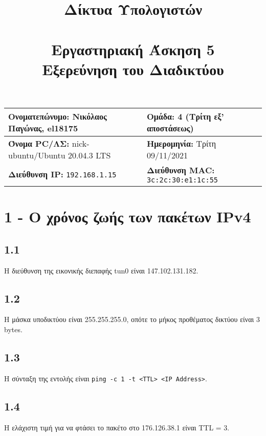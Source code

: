 

\newcommand{\imagesPath}{.}

\title{
	\textbf{Δίκτυα Υπολογιστών} \\~\\
	Εργαστηριακή Άσκηση 5 \\ 
	Εξερεύνηση του Διαδικτύου
}
\author{}
\date{}


	\maketitle
	
	\begin{tabular}{|l|l|}
		\hline
		\textbf{Ονοματεπώνυμο:} Νικόλαος Παγώνας, el18175 & \textbf{Ομάδα:} 4 (Τρίτη εξ' αποστάσεως) \\
		\hline
		\textbf{Όνομα PC/ΛΣ:} nick-ubuntu/Ubuntu 20.04.3 LTS & \textbf{Ημερομηνία:} Τρίτη 09/11/2021  \\
		\hline
		\textbf{Διεύθυνση IP:} \verb|192.168.1.15| & \textbf{Διεύθυνση MAC:} \verb|3c:2c:30:e1:1c:55|\\
		\hline
	\end{tabular}

	\section*{1 - Ο χρόνος ζωής των πακέτων IPv4}
		\subsection*{1.1}
			Η διεύθυνση της εικονικής διεπαφής tun0 είναι 147.102.131.182.
		
		\subsection*{1.2}
			Η μάσκα υποδικτύου είναι 255.255.255.0, οπότε το μήκος προθέματος δικτύου είναι 3 bytes.
		
		\subsection*{1.3}
			Η σύνταξη της εντολής είναι \verb|ping -c 1 -t <TTL> <IP Address>|.
		
		\subsection*{1.4}
			Η ελάχιστη τιμή για να φτάσει το πακέτο στο 176.126.38.1 είναι TTL = 3.
		
